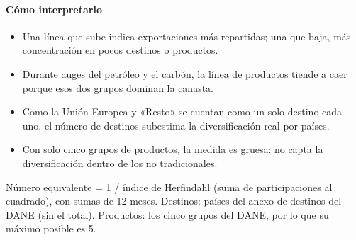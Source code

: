 \paragraph{Cómo interpretarlo}
\begin{itemize}
\item Una línea que sube indica exportaciones más repartidas; una que baja, más concentración en pocos destinos o productos.
\item Durante auges del petróleo y el carbón, la línea de productos tiende a caer porque esos dos grupos dominan la canasta.
\item Como la Unión Europea y «Resto» se cuentan como un solo destino cada uno, el número de destinos subestima la diversificación real por países.
\item Con solo cinco grupos de productos, la medida es gruesa: no capta la diversificación dentro de los no tradicionales.
\end{itemize}
\begin{formulas}[Fórmulas]
\end{formulas}
\begin{metodo}[Metodología]
Número equivalente = 1 / índice de Herfindahl (suma de participaciones al cuadrado), con sumas de 12 meses. Destinos: países del anexo de destinos del DANE (sin el total). Productos: los cinco grupos del DANE, por lo que su máximo posible es 5.
\par{}
\end{metodo}

